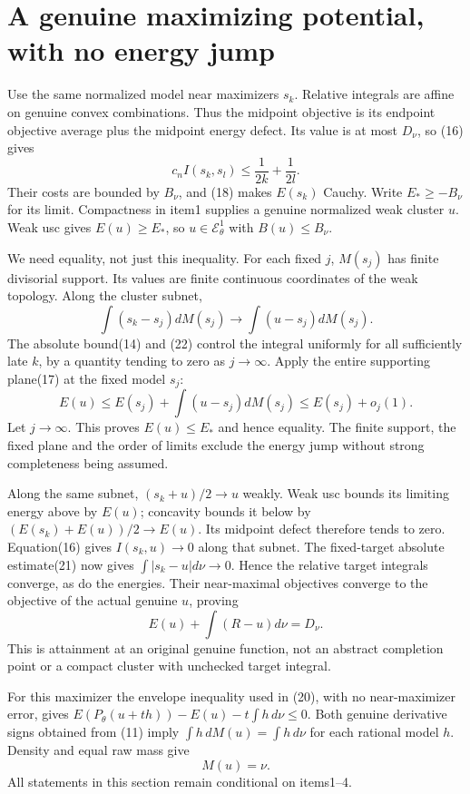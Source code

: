 \documentclass[11pt]{article}
\newcommand{\EE}{\mathcal E^1_\theta}
\begin{document}
\section{A genuine maximizing potential, with no energy jump}
Use the same normalized model near maximizers $s_k$.
Relative integrals are affine on genuine convex combinations. Thus
the midpoint objective is its endpoint objective average plus the
midpoint energy defect. Its value is at most $D_\nu$, so (16) gives
\[
 c_nI(s_k,s_l)\leq\frac1{2k}+\frac1{2l}.                  \tag{22}
\]
Their costs are bounded by $B_\nu$, and (18) makes $E(s_k)$ Cauchy.
Write $E_*\geq-B_\nu$ for its limit. Compactness in item1 supplies
a genuine normalized weak cluster $u$. Weak usc gives
$E(u)\geq E_*$, so $u\in\EE$ with $B(u)\leq B_\nu$.

We need equality, not just this inequality. For each fixed $j$,
$M(s_j)$ has finite divisorial support. Its values are finite
continuous coordinates of the weak topology. Along the cluster subnet,
\[
 \int(s_k-s_j)dM(s_j)\longrightarrow\int(u-s_j)dM(s_j).
\]
The absolute bound(14) and (22) control the integral uniformly for
all sufficiently late $k$, by a quantity tending to zero as $j\to\infty$.
Apply the entire supporting plane(17) at the fixed model $s_j$:
\[
 E(u)\leq E(s_j)+\int(u-s_j)dM(s_j)\leq E(s_j)+o_j(1).
\]
Let $j\to\infty$. This proves $E(u)\leq E_*$ and hence equality.
The finite support, the fixed plane and the order of limits exclude
the energy jump without strong completeness being assumed.

Along the same subnet, $(s_k+u)/2\to u$ weakly. Weak usc bounds
its limiting energy above by $E(u)$; concavity bounds it below by
$(E(s_k)+E(u))/2\to E(u)$. Its midpoint defect therefore tends to zero.
Equation(16) gives $I(s_k,u)\to0$ along that subnet.
The fixed-target absolute estimate(21) now gives
$\int|s_k-u|d\nu\to0$. Hence the relative target integrals converge,
as do the energies. Their near-maximal objectives converge to the
objective of the actual genuine $u$, proving
\[
 E(u)+\int(R-u)d\nu=D_\nu.                               \tag{23}
\]
This is attainment at an original genuine function, not an abstract
completion point or a compact cluster with unchecked target integral.

For this maximizer the envelope inequality used in (20), with no
near-maximizer error, gives
$E(P_\theta(u+th))-E(u)-t\int h\,d\nu\leq0$.
Both genuine derivative signs obtained from (11) imply
$\int h\,dM(u)=\int h\,d\nu$ for each rational model $h$.
Density and equal raw mass give
\[
                              M(u)=\nu.                  \tag{24}
\]
All statements in this section remain conditional on items1--4.
\end{document}
